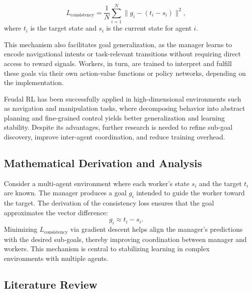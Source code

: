 \documentclass[12pt,a4paper,twoside,openany]{book}
\begin{document}
\begin{equation}
L_{\text{consistency}} = \frac{1}{N} \sum_{i=1}^{N} \| g_i - (t_i - s_i) \|^2,
\label{eq:consistency_loss}
\end{equation}
where \(t_i\) is the target state and \(s_i\) is the current state for agent \(i\).

This mechanism also facilitates goal generalization, as the manager learns to encode navigational intents or task-relevant transitions without requiring direct access to reward signals. Workers, in turn, are trained to interpret and fulfill these goals via their own action-value functions or policy networks, depending on the implementation.

Feudal RL has been successfully applied in high-dimensional environments such as navigation and manipulation tasks, where decomposing behavior into abstract planning and fine-grained control yields better generalization and learning stability. Despite its advantages, further research is needed to refine sub-goal discovery, improve inter-agent coordination, and reduce training overhead.

\subsection*{Mathematical Derivation and Analysis}

Consider a multi-agent environment where each worker’s state \(s_i\) and the target \(t_i\) are known. The manager produces a goal \(g_i\) intended to guide the worker toward the target. The derivation of the consistency loss ensures that the goal approximates the vector difference:
\[
g_i \approx t_i - s_i.
\]
Minimizing \(L_{\text{consistency}}\) via gradient descent helps align the manager’s predictions with the desired sub-goals, thereby improving coordination between manager and workers. This mechanism is central to stabilizing learning in complex environments with multiple agents.

\subsection*{Literature Review}
\end{document}
